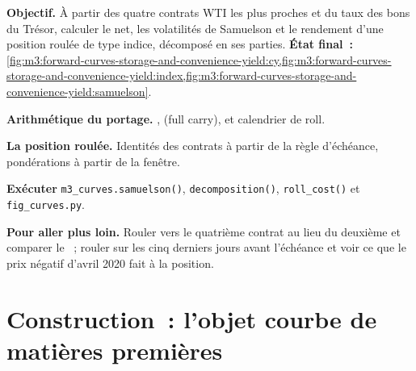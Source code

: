 \begin{tutorial}
\textbf{Objectif.} À partir des quatre contrats WTI les plus proches et du taux des bons du Trésor, calculer le  net, les volatilités de Samuelson et le rendement d'une position roulée de type indice, décomposé en ses
parties. \textbf{État final~:}
\cref{fig:m3:forward-curves-storage-and-convenience-yield:cy,fig:m3:forward-curves-storage-and-convenience-yield:index,fig:m3:forward-curves-storage-and-convenience-yield:samuelson}.
\begin{tutsteps}
\item \textbf{Arithmétique du portage.} ,  (full carry),  et calendrier de roll.
\label{lst:m3:forward-curves-storage-and-convenience-yield:carry}
\item \textbf{La position roulée.} Identités des contrats à partir de la règle d'échéance, pondérations à partir de la fenêtre.
\label{lst:m3:forward-curves-storage-and-convenience-yield:index}
\item \textbf{Exécuter} \texttt{m3\_curves.samuelson()}, \texttt{decomposition()}, \texttt{roll\_cost()} et
\texttt{fig\_curves.py}.
\end{tutsteps}
\textbf{Pour aller plus loin.} Rouler vers le quatrième contrat au lieu du deuxième et comparer le ~; rouler
sur les cinq derniers jours avant l'échéance et voir ce que le prix négatif d'avril 2020 fait à la
position.
\end{tutorial}

\section{Construction~: l'objet courbe de matières premières}\label{bld:m3:forward-curves-storage-and-convenience-yield:commcurve}

